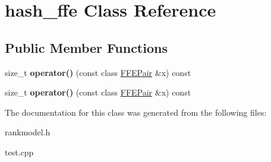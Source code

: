 \hypertarget{classhash__ffe}{\section{hash\-\_\-ffe \-Class \-Reference}
\label{classhash__ffe}
}
\subsection*{\-Public \-Member \-Functions}
\begin{DoxyCompactItemize}
\item 
\hypertarget{classhash__ffe_aca6329ea43476f049b24d34d5e137c25}{size\-\_\-t {\bfseries operator()} (const class \hyperlink{classFFEPair}{\-F\-F\-E\-Pair} \&x) const }\label{classhash__ffe_aca6329ea43476f049b24d34d5e137c25}

\item 
\hypertarget{classhash__ffe_aca6329ea43476f049b24d34d5e137c25}{size\-\_\-t {\bfseries operator()} (const class \hyperlink{classFFEPair}{\-F\-F\-E\-Pair} \&x) const }\label{classhash__ffe_aca6329ea43476f049b24d34d5e137c25}

\end{DoxyCompactItemize}


\-The documentation for this class was generated from the following files\-:\begin{DoxyCompactItemize}
\item 
rankmodel.\-h\item 
test.\-cpp\end{DoxyCompactItemize}
